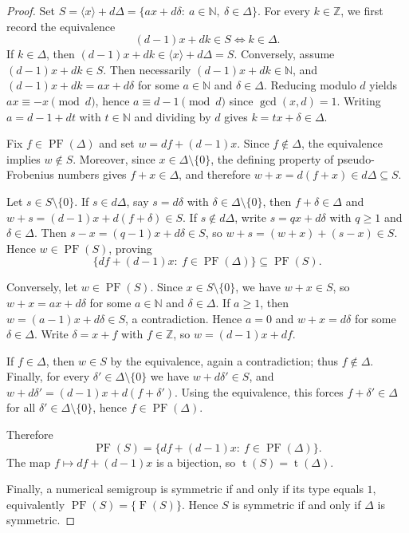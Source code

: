 \documentclass[12pt,a4paper]{amsart}
\theoremstyle{definition}
\theoremstyle{remark}
\begin{document}
\begin{proof}
Set $S=\langle x\rangle+d\Delta=\{ax+d\delta:\ a\in\mathbb{N},\ \delta\in\Delta\}$.
For every \(k\in\mathbb{Z}\), we first record the equivalence
\[
(d-1)x+dk\in S \iff k\in\Delta.
\]
If $k\in\Delta$, then $(d-1)x+dk\in\langle x\rangle+d\Delta=S$. Conversely, assume
\((d-1)x+dk\in S\). Then necessarily \((d-1)x+dk\in\mathbb{N}\), and $(d-1)x+dk=ax+d\delta$ for some $a\in\mathbb{N}$ and
$\delta\in\Delta$. Reducing modulo $d$ yields $ax\equiv -x\pmod d$, hence
$a\equiv d-1\pmod d$ since $\gcd(x,d)=1$. Writing $a=d-1+dt$ with
$t\in\mathbb{N}$ and dividing by $d$ gives $k=tx+\delta\in\Delta$.

Fix $f\in\operatorname{PF}(\Delta)$ and set $w=df+(d-1)x$. Since $f\notin\Delta$,
the equivalence implies $w\notin S$. Moreover, since $x\in\Delta\setminus\{0\}$,
the defining property of pseudo-Frobenius numbers gives $f+x\in\Delta$, and therefore
$w+x=d(f+x)\in d\Delta\subseteq S$.

Let $s\in S\setminus\{0\}$. If $s\in d\Delta$, say $s=d\delta$ with
$\delta\in\Delta\setminus\{0\}$, then $f+\delta\in\Delta$ and
$w+s=(d-1)x+d(f+\delta)\in S$. If $s\notin d\Delta$, write
$s=qx+d\delta$ with $q\ge 1$ and $\delta\in\Delta$. Then
$s-x=(q-1)x+d\delta\in S$, so $w+s=(w+x)+(s-x)\in S$. Hence
$w\in\operatorname{PF}(S)$, proving
\[
\{df+(d-1)x:\ f\in\operatorname{PF}(\Delta)\}\subseteq \operatorname{PF}(S).
\]

Conversely, let $w\in\operatorname{PF}(S)$. Since $x\in S\setminus\{0\}$, we have
$w+x\in S$, so $w+x=ax+d\delta$ for some $a\in\mathbb{N}$ and $\delta\in\Delta$.
If $a\ge 1$, then $w=(a-1)x+d\delta\in S$, a contradiction. Hence $a=0$ and
$w+x=d\delta$ for some $\delta\in\Delta$. Write $\delta=x+f$ with
$f\in\mathbb{Z}$, so $w=(d-1)x+df$.

If $f\in\Delta$, then $w\in S$ by the equivalence, again a contradiction; thus
$f\notin\Delta$. Finally, for every $\delta'\in\Delta\setminus\{0\}$ we have
$w+d\delta'\in S$, and
$w+d\delta'=(d-1)x+d(f+\delta')$. Using the equivalence, this forces
$f+\delta'\in\Delta$ for all $\delta'\in\Delta\setminus\{0\}$, hence
$f\in\operatorname{PF}(\Delta)$.

Therefore
\[
\operatorname{PF}(S)=\{df+(d-1)x:\ f\in \operatorname{PF}(\Delta)\}.
\]
The map $f\mapsto df+(d-1)x$ is a bijection, so $\operatorname{t}(S)=\operatorname{t}(\Delta)$.

Finally, a numerical semigroup is symmetric if and only if its type equals $1$,
equivalently $\operatorname{PF}(S)=\{\operatorname{F}(S)\}$. Hence $S$ is symmetric if and only if $\Delta$ is symmetric. 
\end{proof}
\end{document}
